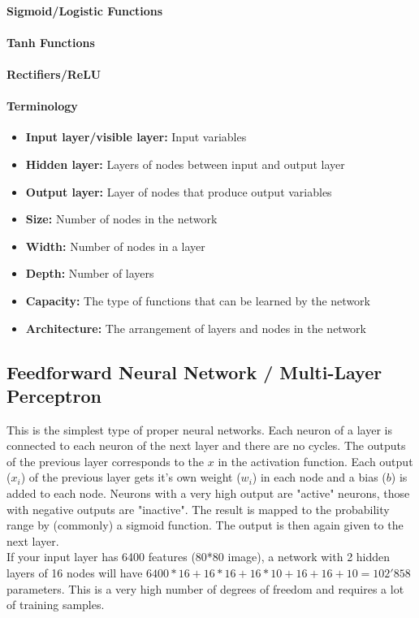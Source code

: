 \documentclass[../main.tex]{subfiles}
\begin{document}
\paragraph{Sigmoid/Logistic Functions}

\paragraph{Tanh Functions}

\paragraph{Rectifiers/ReLU}



\paragraph{Terminology}
\begin{itemize}
    \item [] \textbf{Input layer/visible layer:} Input variables
    \item [] \textbf{Hidden layer:} Layers of nodes between input and output layer
    \item [] \textbf{Output layer:} Layer of nodes that produce output variables
    \item [] \textbf{Size:} Number of nodes in the network
    \item [] \textbf{Width:} Number of nodes in a layer
    \item [] \textbf{Depth:} Number of layers
    \item [] \textbf{Capacity:} The type of functions that can be learned by the network
    \item [] \textbf{Architecture:} The arrangement of layers and nodes in the network
\end{itemize}

\subsection{Feedforward Neural Network / Multi-Layer Perceptron}
This is the simplest type of proper neural networks. Each neuron of a layer is connected to each neuron of the next layer and there are no cycles. 
The outputs of the previous layer corresponds to the $x$ in the activation function. Each output ($x_i$) of the previous layer gets it's own weight ($w_i$) in each node and a bias ($b$) is added to each node. Neurons with a very high output are "active" neurons, those with negative outputs are "inactive". The result is mapped to the probability range by (commonly) a sigmoid function. The output is then again given to the next layer. \\
\attention If your input layer has 6400 features (80*80 image), a network with 2 hidden layers of 16 nodes will have $6400*16+16*16+16*10+16+16+10 = 102'858$ parameters. This is a very high number of degrees of freedom and requires a lot of training samples.
\end{document}

